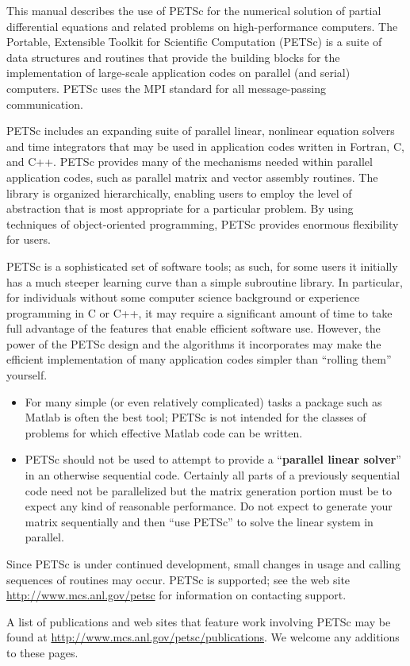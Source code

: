 
%
%

\medskip \medskip
This manual describes the use of PETSc for the numerical solution
of partial differential equations and related problems 
on high-performance computers.  The
Portable, Extensible Toolkit for Scientific Computation (PETSc) is a
suite of data structures and routines that provide the building
blocks for the implementation of large-scale application codes on parallel
(and serial) computers.  PETSc uses the MPI standard for all
message-passing communication.

PETSc includes an expanding suite of parallel linear, nonlinear
equation solvers and time integrators that may be
used in application codes written in Fortran, C, and C++.  PETSc
provides many of the mechanisms needed within parallel application
codes, such as parallel matrix and vector assembly routines. The library is
organized hierarchically, enabling users to employ the level of
abstraction that is most appropriate for a particular problem. By
using techniques of object-oriented programming, PETSc provides
enormous flexibility for users.

PETSc is a sophisticated set of software tools; as such, for some
users it initially has a much steeper learning curve than a simple
subroutine library. In particular, for individuals without some
computer science background or experience programming in C or C++, it
may require a significant amount of time to take full advantage of the
features that enable efficient software use.  However, the power of
the PETSc design and the algorithms it incorporates may make the efficient
implementation of many application codes simpler than ``rolling
them'' yourself.
\begin{itemize}
\item  For many simple (or even relatively complicated)
tasks a package such as Matlab is often the best tool; PETSc is not
intended for the classes of problems for which effective Matlab code
can be written.
\item PETSc should not be used to attempt to provide
a ``{\bf parallel linear solver}'' in an otherwise sequential code.
Certainly all parts of a previously sequential code need not be parallelized but the 
matrix generation portion must be to expect any kind of reasonable performance.
Do not expect to generate your matrix sequentially and then ``use PETSc'' to solve
the linear system in parallel.
\end{itemize}

Since PETSc is under continued development, small changes in usage and
calling sequences of routines may occur.  PETSc is supported; see the
web site \href{http://www.mcs.anl.gov/petsc}{http://www.mcs.anl.gov/petsc} for information on
contacting support.

A list of publications and web sites that feature work involving PETSc may be found
at \href{http://www.mcs.anl.gov/petsc/publications}{http://www.mcs.anl.gov/petsc/publications}. 
We welcome any additions to these pages.

\medskip \medskip



